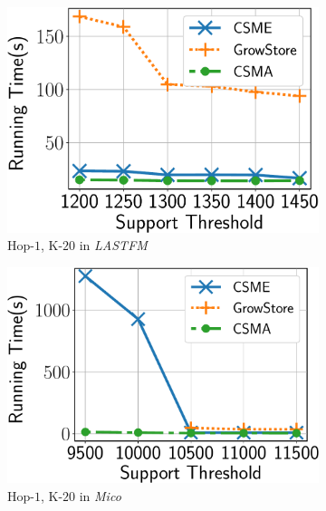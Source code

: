 \begin{figure}
	\vspace{-2mm}
	\centering
	\begin{subfigure}[t]{0.25\textwidth}
		\includegraphics[scale=0.24]{img2/lastfm/lastfm_h1.pdf}
		\caption{\scriptsize {\sf Hop-$1$, K-$20$} in {\em LASTFM}}
		\label{fig:lastfm_h1}
	\end{subfigure}%
	\begin{subfigure}[t]{0.25\textwidth}
		\includegraphics[scale=0.24]{img2/mico/mico_h1.pdf}
		\caption{\scriptsize {\sf Hop-$1$, K-$20$} in {\em Mico}}
		\label{fig:mico_h1}
	\end{subfigure}%
	\begin{subfigure}[t]{0.25\textwidth}

\end{subfigure}
\end{figure}
